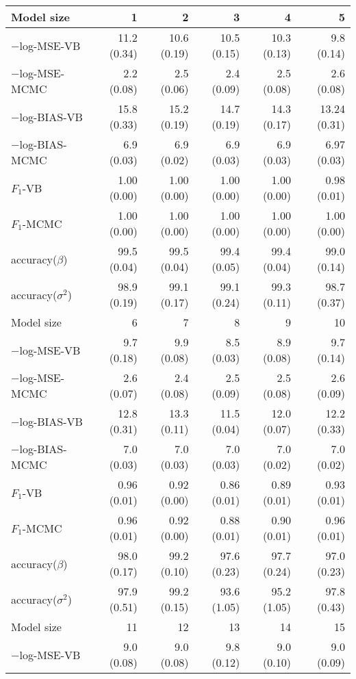 \documentclass[11pt]{article}
\newtheorem{Main Result}{Main Result}
\begin{document}
\begin{table}[h]
	\centering
	\small{
		\begin{tabular}{l|rrrrr}
			\hline
			Model size & 1 & 2 & 3 & 4 & 5  \\
			\hline
			$-$log-MSE-VB & 11.2 (0.34) & 10.6 (0.19) & 10.5 (0.15) & 10.3 (0.13) & 9.8 (0.14) \\
			$-$log-MSE-MCMC & 2.2  (0.08) & 2.5 (0.06) & 2.4 (0.09) & 2.5 (0.08) & 2.6 (0.08) \\
			$-$log-BIAS-VB & 15.8 (0.33) & 15.2 (0.19) & 14.7 (0.19) & 14.3 (0.17) & 13.24 (0.31) \\
			$-$log-BIAS-MCMC & 6.9 (0.03) & 6.9 (0.02) & 6.9 (0.03) & 6.9 (0.03) & 6.97 (0.03) \\
			$F_1$-VB & 1.00 (0.00) & 1.00 (0.00) & 1.00 (0.00) & 1.00 (0.00) & 0.98 (0.01) \\
			$F_1$-MCMC & 1.00 (0.00) & 1.00 (0.00) & 1.00 (0.00) & 1.00 (0.00) & 1.00 (0.00) \\
			accuracy($\beta$)    & 99.5 (0.04) & 99.5 (0.04) & 99.4 (0.05) & 99.4 (0.04) & 99.0 (0.14) \\
			accuracy($\sigma^2$) & 98.9 (0.19) & 99.1 (0.17) & 99.1 (0.24) & 99.3 (0.11) & 98.7 (0.37) \\
			\hline
			\hline
			Model size & 6 & 7 & 8 & 9 & 10 \\
			\hline
			$-$log-MSE-VB    & 9.7 (0.18) & 9.9 (0.08) & 8.5 (0.03) & 8.9 (0.08) & 9.7 (0.14) \\
			$-$log-MSE-MCMC  & 2.6 (0.07) & 2.4 (0.08) & 2.5 (0.09) & 2.5 (0.08) & 2.6 (0.09) \\
			$-$log-BIAS-VB   & 12.8 (0.31) & 13.3 (0.11) & 11.5 (0.04) & 12.0 (0.07) & 12.2 (0.33) \\
			$-$log-BIAS-MCMC & 7.0 (0.03) & 7.0 (0.03) & 7.0 (0.03) & 7.0 (0.02) & 7.0 (0.02) \\
			$F_1$-VB         & 0.96 (0.01) & 0.92 (0.00) & 0.86 (0.01) & 0.89 (0.01) & 0.93 (0.01) \\
			$F_1$-MCMC       & 0.96 (0.01) & 0.92 (0.00) & 0.88 (0.01) & 0.90 (0.01) & 0.96 (0.01) \\
			accuracy($\beta$)     & 98.0 (0.17) & 99.2 (0.10) & 97.6 (0.23) & 97.7 (0.24) & 97.0 (0.23) \\
			accuracy($\sigma^2$)  & 97.9 (0.51) & 99.2 (0.15) & 93.6 (1.05) & 95.2 (1.05) & 97.8 (0.43) \\
			\hline
			\hline
			Model size & 11 & 12 & 13 & 14 & 15  \\
			\hline
			$-$log-MSE-VB    & 9.0   (0.08) & 9.0 (0.08)   & 9.8 (0.12) & 9.0 (0.10) & 9.0  (0.09) \\

\end{tabular}}
\end{table}
\end{document}
